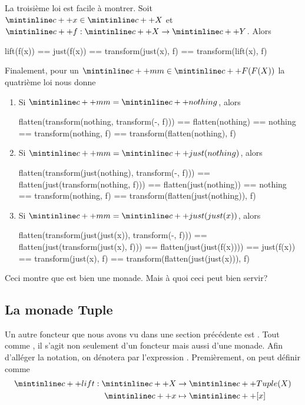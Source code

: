 La troisième loi est facile à montrer. Soit $\cc{x} \in \cc{X}$ et
$\cc{f} : \cc{X} \to \cc{Y}$. Alors
\begin{cpp}
    lift(f(x)) == just(f(x))
               == transform(just(x), f)
               == transform(lift(x), f)
\end{cpp}

Finalement, pour un $\cc{mm} \in \cc{F(F(X))}$ la quatrième loi nous donne
\begin{enumerate}
    \item Si $\cc{mm} = \cc{nothing}$, alors
    \begin{cpp}
        flatten(transform(nothing, transform(-, f)))
            == flatten(nothing)
            == nothing
            == transform(nothing, f)
            == transform(flatten(nothing), f)
    \end{cpp}

    \item Si $\cc{mm} = \cc{just(nothing)}$, alors
    \begin{cpp}
        flatten(transform(just(nothing), transform(-, f)))
            == flatten(just(transform(nothing, f)))
            == flatten(just(nothing))
            == nothing
            == transform(nothing, f)
            == transform(flatten(just(nothing)), f)
    \end{cpp}

    \item Si $\cc{mm} = \cc{just(just(x))}$, alors
    \begin{cpp}
        flatten(transform(just(just(x)), transform(-, f)))
            == flatten(just(transform(just(x), f)))
            == flatten(just(just(f(x))))
            == just(f(x))
            == transform(just(x), f)
            == transform(flatten(just(just(x))), f)
    \end{cpp}
\end{enumerate}

Ceci montre que  est bien une monade. Mais à quoi ceci peut bien
servir?



\subsection{La monade Tuple}
Un autre foncteur que nous avons vu dans une section précédente est .
Tout comme , il s'agit non seulement d'un foncteur mais aussi d'une
monade. Afin d'alléger la notation, on dénotera par \cc{[x1, ..., xn]}
l'expression . Premièrement, on peut définir
 comme
\begin{align*}
    \cc{lift} : \cc{X} &\to \cc{Tuple(X)}           \\
                \cc{x} &\mapsto \cc{[x]}  \\
\end{align*}

